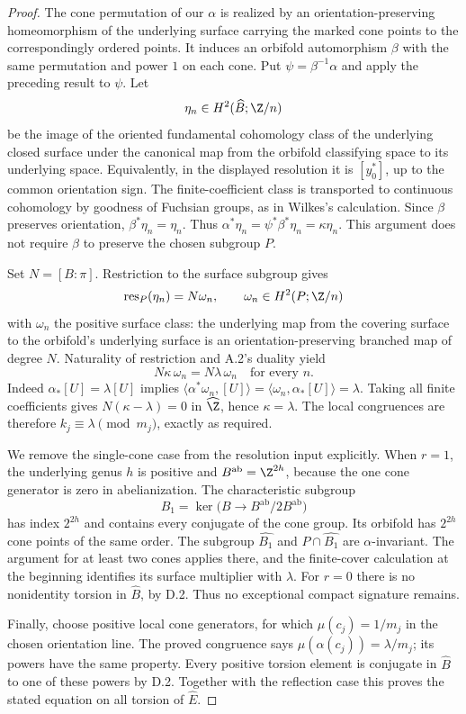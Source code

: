 \begin{proof}
The cone permutation of our $\alpha$ is realized by an
orientation-preserving homeomorphism of the underlying surface carrying
the marked cone points to the correspondingly ordered points.  It
induces an orbifold automorphism $\beta$ with the same permutation and
power $1$ on each cone.  Put $\psi=\beta^{-1}\alpha$ and apply the
preceding result to $\psi$.  Let
\[
 \eta_n\in H^2(\widehat B;\Z/n)
\]
be the image of the oriented fundamental cohomology class of the
underlying closed surface under the canonical map from the orbifold
classifying space to its underlying space.  Equivalently, in the
displayed resolution it is $[y_0^*]$, up to the common orientation sign.
The finite-coefficient class is transported to continuous cohomology by
goodness of Fuchsian groups, as in Wilkes's calculation.
Since $\beta$ preserves orientation, $\beta^*\eta_n=\eta_n$.
Thus $\alpha^*\eta_n=\psi^*\beta^*\eta_n=\kappa\eta_n$.
This argument does not require $\beta$ to preserve the chosen subgroup
$P$.

Set $N=[B:\pi]$.  Restriction to the surface subgroup gives
\[
 \operatorname{res}_{P}(\eta_n)=N\omega_n,
 \qquad\omega_n\in H^2(P;\Z/n)
\]
with $\omega_n$ the positive surface class: the underlying map from
the covering surface to the orbifold's underlying surface is an
orientation-preserving branched map of degree $N$.  Naturality of
restriction and A.2's duality yield
\[
 N\kappa\,\omega_n=N\lambda\,\omega_n
       \quad\text{for every }n.
\]
Indeed $\alpha_*[U]=\lambda[U]$ implies
$\langle\alpha^*\omega_n,[U]\rangle
=\langle\omega_n,\alpha_*[U]\rangle=\lambda$.
Taking all finite coefficients gives $N(\kappa-\lambda)=0$ in
$\widehat\Z$, hence $\kappa=\lambda$.  The local congruences are
therefore $k_j\equiv\lambda\pmod{m_j}$, exactly as required.

We remove the single-cone case from the resolution input explicitly.
When $r=1$, the underlying genus $h$ is positive and
$B^{\mathrm{ab}}=\Z^{2h}$, because the one cone generator is zero in
abelianization.  The characteristic subgroup
\[
 B_1=\ker\bigl(B\longrightarrow B^{\mathrm{ab}}/2B^{\mathrm{ab}}\bigr)
\]
has index $2^{2h}$ and contains every conjugate of the cone group.
Its orbifold has $2^{2h}$ cone points of the same order.  The subgroup
$\widehat{B_1}$ and $P\cap\widehat{B_1}$ are $\alpha$-invariant.
The argument for at least two cones applies there, and the finite-cover
calculation at the beginning identifies its surface multiplier with
$\lambda$.  For $r=0$ there is no nonidentity torsion in $\widehat B$,
by D.2.  Thus no exceptional compact signature remains.

Finally, choose positive local cone generators, for which
$\mu(c_j)=1/m_j$ in the chosen orientation line.  The proved congruence
says $\mu(\alpha(c_j))=\lambda/m_j$; its powers have the same
property.  Every positive torsion element is conjugate in $\widehat B$
to one of these powers by D.2.  Together with the reflection case this
proves the stated equation on all torsion of $\widehat E$.
\end{proof}

